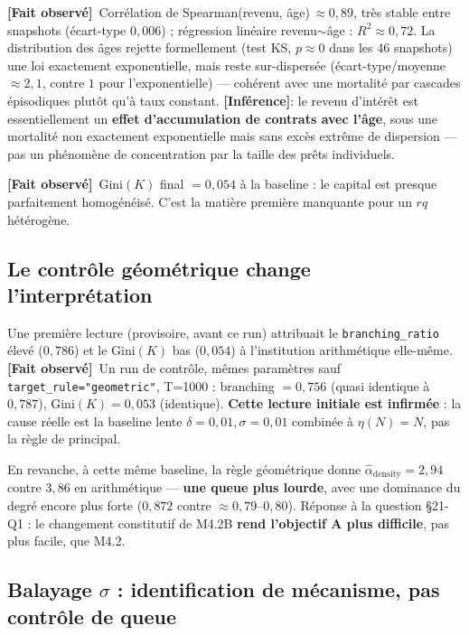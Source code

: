 \documentclass[11pt,a4paper]{article}
\newcommand{\code}[1]{\texttt{#1}}
\newcommand{\fait}{\textbf{[Fait observé]}}
\newcommand{\inference}{\textbf{[Inférence]}}
\begin{document}
\fait\ Corrélation de Spearman(revenu, âge)$\,\approx0{,}89$, très stable
entre snapshots (écart-type $0{,}006$) ; régression linéaire
revenu$\sim$âge : $R^2\approx0{,}72$. La distribution des âges rejette
formellement (test KS, $p\approx0$ dans les 46 snapshots) une loi
exactement exponentielle, mais reste sur-dispersée (écart-type/moyenne
$\approx2{,}1$, contre $1$ pour l'exponentielle) --- cohérent avec une
mortalité par cascades épisodiques plutôt qu'à taux constant.
\inference : le revenu d'intérêt est essentiellement un
\textbf{effet d'accumulation de contrats avec l'âge}, sous une mortalité
non exactement exponentielle mais sans excès extrême de dispersion --- pas
un phénomène de concentration par la taille des prêts individuels.

\fait\ Gini$(K)$ final $=0{,}054$ à la baseline : le capital est presque
parfaitement homogénéisé. C'est la matière première manquante pour un
$rq$ hétérogène.

\subsection{Le contrôle géométrique change l'interprétation}

Une première lecture (provisoire, avant ce run) attribuait le
\code{branching\_ratio} élevé ($0{,}786$) et le Gini$(K)$ bas ($0{,}054$) à
l'institution arithmétique elle-même. \fait\ Un run de contrôle, mêmes
paramètres sauf \code{target\_rule="geometric"}, T=1000 : branching
$=0{,}756$ (quasi identique à $0{,}787$), Gini$(K)=0{,}053$ (identique).
\textbf{Cette lecture initiale est infirmée} : la cause réelle est la
baseline lente $\delta{=}0{,}01,\sigma{=}0{,}01$ combinée à $\eta(N){=}N$,
pas la règle de principal.

En revanche, à cette même baseline, la règle géométrique donne
$\hat\alpha_{\mathrm{density}}=2{,}94$ contre $3{,}86$ en arithmétique
--- \textbf{une queue plus lourde}, avec une dominance du degré encore plus
forte ($0{,}872$ contre $\approx0{,}79$--$0{,}80$). Réponse à la question
§21-Q1 : le changement constitutif de M4.2B \textbf{rend l'objectif A plus
difficile}, pas plus facile, que M4.2.

\subsection{Balayage $\sigma$ : identification de mécanisme, pas contrôle
de queue}
\end{document}

